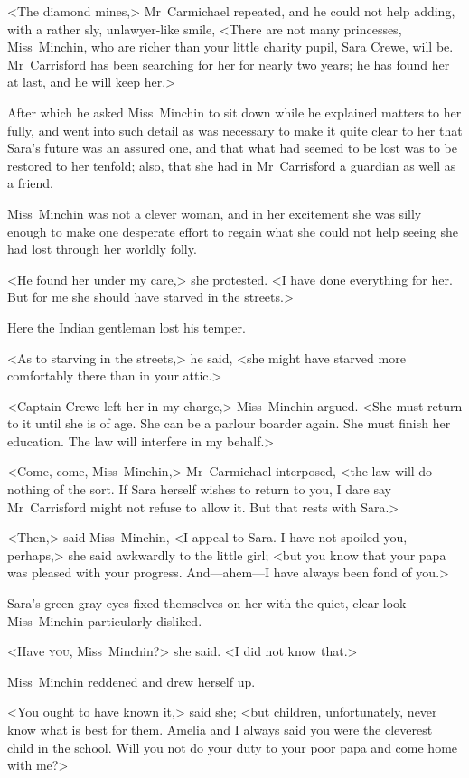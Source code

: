 <The diamond mines,> Mr~Carmichael repeated, and he could not help adding, with a rather sly, unlawyer-like smile, <There are not many princesses, Miss~Minchin, who are richer than your little charity pupil, Sara Crewe, will be. Mr~Carrisford has been searching for her for nearly two years; he has found her at last, and he will keep her.>

After which he asked Miss~Minchin to sit down while he explained matters to her fully, and went into such detail as was necessary to make it quite clear to her that Sara's future was an assured one, and that what had seemed to be lost was to be restored to her tenfold; also, that she had in Mr~Carrisford a guardian as well as a friend.

Miss~Minchin was not a clever woman, and in her excitement she was silly enough to make one desperate effort to regain what she could not help seeing she had lost through her worldly folly.

<He found her under my care,> she protested. <I have done everything for her. But for me she should have starved in the streets.>

Here the Indian gentleman lost his temper.

<As to starving in the streets,> he said, <she might have starved more comfortably there than in your attic.>

<Captain Crewe left her in my charge,> Miss~Minchin argued. <She must return to it until she is of age. She can be a parlour boarder again. She must finish her education. The law will interfere in my behalf.>

<Come, come, Miss~Minchin,> Mr~Carmichael interposed, <the law will do nothing of the sort. If Sara herself wishes to return to you, I dare say Mr~Carrisford might not refuse to allow it. But that rests with Sara.>

<Then,> said Miss~Minchin, <I appeal to Sara. I have not spoiled you, perhaps,> she said awkwardly to the little girl; <but you know that your papa was pleased with your progress. And—ahem—I have always been fond of you.>

Sara's green-gray eyes fixed themselves on her with the quiet, clear look Miss~Minchin particularly disliked.

<Have \textsc{you}, Miss~Minchin?> she said. <I did not know that.>

Miss~Minchin reddened and drew herself up.

<You ought to have known it,> said she; <but children, unfortunately, never know what is best for them. Amelia and I always said you were the cleverest child in the school. Will you not do your duty to your poor papa and come home with me?>

